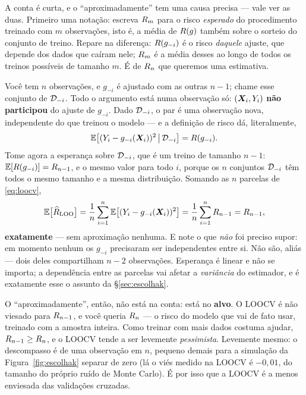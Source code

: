 \documentclass[11pt,a4paper]{article}
\begin{document}
\begin{observacao}\label{obs:loo}
A conta é curta, e o ``aproximadamente'' tem uma causa precisa --- vale ver as
duas. Primeiro uma notação: escreva $R_m$ para o risco \emph{esperado} do
procedimento treinado com $m$ observações, isto é, a média de $R(g)$ também
sobre o sorteio do conjunto de treino. Repare na diferença: $R(g_{-i})$ é o
risco \emph{daquele} ajuste, que depende dos dados que caíram nele; $R_m$ é a
média desses ao longo de todos os treinos possíveis de tamanho $m$. É de
$R_n$ que queremos uma estimativa.

Você tem $n$ observações, e $g_{-i}$ é ajustado com as outras $n-1$; chame esse
conjunto de $\mathcal{D}_{-i}$. Todo o argumento está numa observação só:
$(\bm{X}_i,Y_i)$ \textbf{não participou} do ajuste de $g_{-i}$. Dado $\mathcal{D}_{-i}$, o
par é uma observação nova, independente do que treinou o modelo --- e a definição
de risco dá, literalmente,
\[
  \mathbb{E}\big[(Y_i-g_{-i}(\bm{X}_i))^2 \,\big|\, \mathcal{D}_{-i}\big] = R(g_{-i}) .
\]
Tome agora a esperança sobre $\mathcal{D}_{-i}$, que é um treino de tamanho $n-1$:
$\mathbb{E}[R(g_{-i})]=R_{n-1}$, e o mesmo valor para todo $i$, porque os $n$
conjuntos $\mathcal{D}_{-i}$ têm todos o mesmo tamanho e a mesma distribuição. Somando
as $n$ parcelas de \eqref{eq:loocv},
\[
  \mathbb{E}\big[\widehat{R}_{\text{LOO}}\big]
   = \frac1n\sum_{i=1}^n \mathbb{E}\big[(Y_i-g_{-i}(\bm{X}_i))^2\big]
   = \frac1n\sum_{i=1}^n R_{n-1}
   = R_{n-1},
\]
\textbf{exatamente} --- sem aproximação nenhuma. E note o que \emph{não} foi
preciso supor: em momento nenhum os $g_{-i}$ precisaram ser independentes entre si.
Não são, aliás --- dois deles compartilham $n-2$ observações. Esperança é linear e
não se importa; a dependência entre as parcelas vai afetar a \emph{variância} do
estimador, e é exatamente esse o assunto da §\ref{sec:escolhak}.

O ``aproximadamente'', então, não está na conta: está no \textbf{alvo}. O LOOCV é
não viesado para $R_{n-1}$, e você queria $R_n$ --- o risco do modelo que
vai de fato usar, treinado com a amostra inteira. Como treinar com mais dados
costuma ajudar, $R_{n-1}\ge R_n$, e o LOOCV tende a ser levemente
\emph{pessimista}. Levemente mesmo: o descompasso é de uma observação em $n$,
pequeno demais para a simulação da Figura~\ref{fig:escolhak} separar de zero (lá o
viés medido na LOOCV é $-0{,}01$, do tamanho do próprio ruído de Monte Carlo). É
por isso que a LOOCV é a menos enviesada das validações cruzadas.
\end{observacao}
\end{document}
